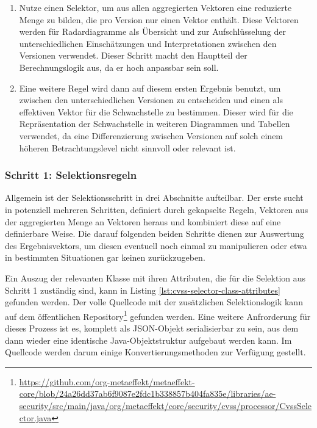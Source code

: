 \begin{enumerate}
    \item
    Nutze einen Selektor, um aus allen aggregierten Vektoren eine reduzierte Menge zu bilden, die pro Version nur einen Vektor enthält.
    Diese Vektoren werden für Radardiagramme als Übersicht und zur Aufschlüsselung der unterschiedlichen Einschätzungen und Interpretationen zwischen den Versionen verwendet.
    Dieser Schritt macht den Hauptteil der Berechnungslogik aus, da er hoch anpassbar sein soll.
    \item
    Eine weitere Regel wird dann auf diesem ersten Ergebnis benutzt, um zwischen den unterschiedlichen Versionen zu entscheiden und einen als effektiven Vektor für die Schwachstelle zu bestimmen.
    Dieser wird für die Repräsentation der Schwachstelle in weiteren Diagrammen und Tabellen verwendet, da eine Differenzierung zwischen Versionen auf solch einem höheren Betrachtungslevel nicht sinnvoll oder relevant ist.
\end{enumerate}

\subsubsection{Schritt 1: Selektionsregeln} \label{subsubsec:projektbericht-loesungsweg-cvss-selection-rules-1}

Allgemein ist der Selektionsschritt in drei Abschnitte aufteilbar.
Der erste sucht in potenziell mehreren Schritten, definiert durch gekapselte Regeln, Vektoren aus der aggregierten Menge an Vektoren heraus und kombiniert diese auf eine definierbare Weise.
Die darauf folgenden beiden Schritte dienen zur Auswertung des Ergebnisvektors, um diesen eventuell noch einmal zu manipulieren oder etwa in bestimmten Situationen gar keinen zurückzugeben.

Ein Auszug der relevanten Klasse mit ihren Attributen, die für die Selektion aus Schritt 1 zuständig sind, kann in Listing \ref{lst:cvss-selector-class-attributes} gefunden werden.
Der volle Quellcode mit der zusätzlichen Selektionslogik kann auf dem öffentlichen Repository\footnote{\url{https://github.com/org-metaeffekt/metaeffekt-core/blob/24a26dd37ab6f9087e2fdc1b338857b404fa835e/libraries/ae-security/src/main/java/org/metaeffekt/core/security/cvss/processor/CvssSelector.java}} gefunden werden.
Eine weitere Anfrorderung für dieses Prozess ist es, komplett als JSON-Objekt serialisierbar zu sein, aus dem dann wieder eine identische Java-Objektstruktur aufgebaut werden kann.
Im Quellcode werden darum einige Konvertierungsmethoden zur Verfügung gestellt.

